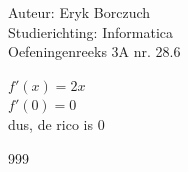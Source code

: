 \documentclass[a4paper]{article}
\begin{document}
  
\noindent \large Auteur: Eryk Borczuch \\
\noindent \large Studierichting: Informatica\\
\noindent \large Oefeningenreeks 3A nr. 28.6\\

\medskip

\normalsize

$f'(x) = 2x$\\

$f'(0) = 0$\\

dus, de rico is $0$

\begin{thebibliography}{999}
\end{thebibliography}
\end{document}
